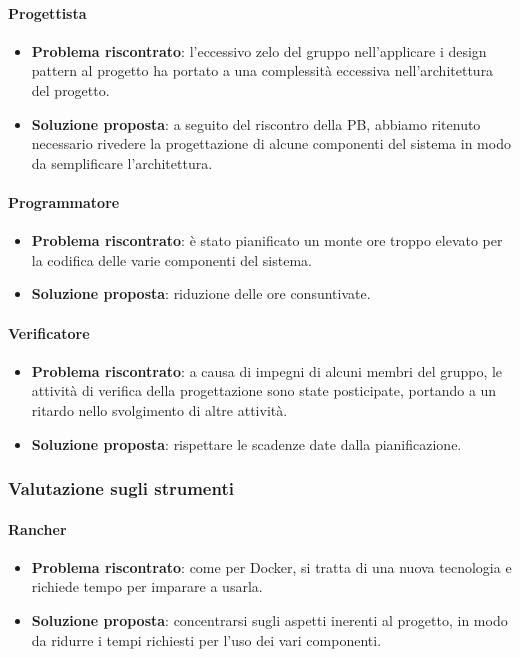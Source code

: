         \paragraph{Progettista}
            \begin{itemize}
                \item \textbf{Problema riscontrato}: l'eccessivo zelo del gruppo nell'applicare i design pattern al progetto ha portato a una complessità eccessiva nell'architettura del progetto.
                \item \textbf{Soluzione proposta}: a seguito del riscontro della PB, abbiamo ritenuto necessario rivedere la progettazione di alcune componenti del sistema in modo da semplificare l'architettura.
            \end{itemize}

        \paragraph{Programmatore}
            \begin{itemize}
                \item \textbf{Problema riscontrato}: è stato pianificato un monte ore troppo elevato per la codifica delle varie componenti del sistema.
                \item \textbf{Soluzione proposta}: riduzione delle ore consuntivate.
            \end{itemize}

        \paragraph{Verificatore}
            \begin{itemize}
                \item \textbf{Problema riscontrato}: a causa di impegni di alcuni membri del gruppo, le attività di verifica della progettazione sono state posticipate, portando a un ritardo nello svolgimento di altre attività.
                \item \textbf{Soluzione proposta}: rispettare le scadenze date dalla pianificazione.
            \end{itemize}

    \subsubsection{Valutazione sugli strumenti}

        \paragraph{Rancher}
            \begin{itemize}
                \item \textbf{Problema riscontrato}: come per Docker, si tratta di una nuova tecnologia e richiede tempo per imparare a usarla.
                \item \textbf{Soluzione proposta}: concentrarsi sugli aspetti inerenti al progetto, in modo da ridurre i tempi richiesti per l'uso dei vari componenti.
            \end{itemize}
        
